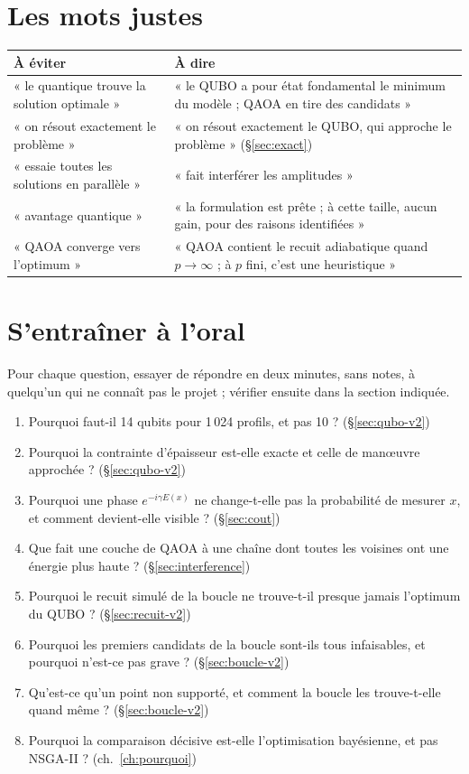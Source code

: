 \section{Les mots justes}
\begin{center}
\renewcommand{\arraystretch}{1.25}
\small
\begin{tabularx}{\linewidth}{>{\raggedright\arraybackslash}X>{\raggedright\arraybackslash}X}
\toprule
À éviter & À dire \\
\midrule
« le quantique trouve la solution optimale » & « le QUBO a pour état fondamental le minimum du modèle ; QAOA en tire des candidats » \\
« on résout exactement le problème » & « on résout exactement le QUBO, qui approche le problème » (§\ref{sec:exact}) \\
« essaie toutes les solutions en parallèle » & « fait interférer les amplitudes » \\
« avantage quantique » & « la formulation est prête ; à cette taille, aucun gain, pour des raisons identifiées » \\
« QAOA converge vers l'optimum » & « QAOA contient le recuit adiabatique quand $p\to\infty$ ; à $p$ fini, c'est une heuristique » \\
\bottomrule
\end{tabularx}
\end{center}

\section{S'entraîner à l'oral}
Pour chaque question, essayer de répondre en deux minutes, sans notes, à quelqu'un qui ne connaît pas le projet ; vérifier ensuite dans la section indiquée.
\begin{enumerate}
\item Pourquoi faut-il 14 qubits pour 1\,024 profils, et pas 10 ? (§\ref{sec:qubo-v2})
\item Pourquoi la contrainte d'épaisseur est-elle exacte et celle de manœuvre approchée ? (§\ref{sec:qubo-v2})
\item Pourquoi une phase $e^{-i\gamma E(x)}$ ne change-t-elle pas la probabilité de mesurer $x$, et comment devient-elle visible ? (§\ref{sec:cout})
\item Que fait une couche de QAOA à une chaîne dont toutes les voisines ont une énergie plus haute ? (§\ref{sec:interference})
\item Pourquoi le recuit simulé de la boucle ne trouve-t-il presque jamais l'optimum du QUBO ? (§\ref{sec:recuit-v2})
\item Pourquoi les premiers candidats de la boucle sont-ils tous infaisables, et pourquoi n'est-ce pas grave ? (§\ref{sec:boucle-v2})
\item Qu'est-ce qu'un point non supporté, et comment la boucle les trouve-t-elle quand même ? (§\ref{sec:boucle-v2})
\item Pourquoi la comparaison décisive est-elle l'optimisation bayésienne, et pas NSGA-II ? (ch.~\ref{ch:pourquoi})
\end{enumerate}
